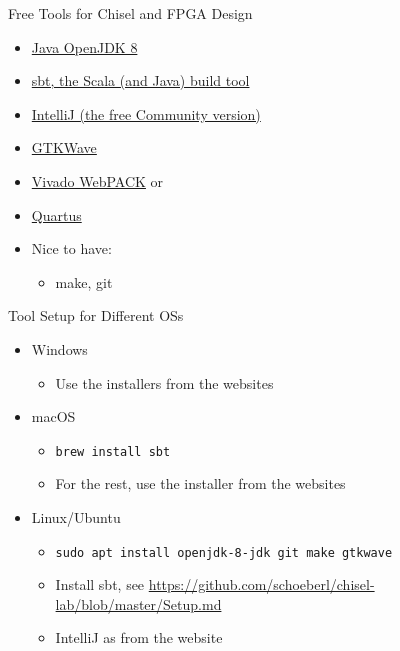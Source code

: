 \documentclass[xcolor=pdflatex,dvipsnames,table]{beamer}
\newcommand{\code}[1]{{\texttt{#1}}}
\begin{document}
\begin{frame}[fragile]{Free Tools for Chisel and FPGA Design}
\begin{itemize}
\item \href{https://adoptopenjdk.net/}{Java OpenJDK 8}
\item \href{https://www.scala-sbt.org/}{sbt, the Scala (and Java) build tool}
\item \href{https://www.jetbrains.com/idea/download/}{IntelliJ (the free Community version)}
\item \href{http://gtkwave.sourceforge.net/}{GTKWave}
\item \href{https://www.xilinx.com/products/design-tools/vivado/vivado-webpack.html}{Vivado WebPACK} or
\item \href{http://www.altera.com/products/software/quartus-ii/web-edition/qts-we-index.html}{Quartus}
\item Nice to have:
\begin{itemize}
\item make, git
\end{itemize}
\end{itemize}
\end{frame}

\begin{frame}[fragile]{Tool Setup for Different OSs}
\begin{itemize}
\item Windows
\begin{itemize}
\item Use the installers from the websites
\end{itemize}
\item macOS
\begin{itemize}
\item \code{brew install sbt}
\item For the rest, use the installer from the websites
\end{itemize}
\item Linux/Ubuntu
\begin{itemize}
\item \code{sudo apt install openjdk-8-jdk git make gtkwave}
\item Install sbt, see \url{https://github.com/schoeberl/chisel-lab/blob/master/Setup.md}
\item IntelliJ as from the website
\end{itemize}
\end{itemize}
\end{frame}
\end{document}
